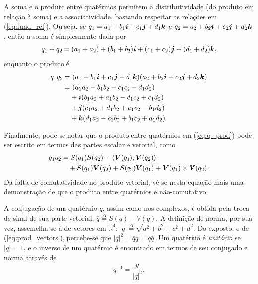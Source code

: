 A soma e o produto entre quat\'ernios permitem a distributividade (do produto em rela\c c\~ao \`a soma) e a associatividade, bastando respeitar as rela\c c\~oes em (\ref{eq:fund_rel}). Ou seja, se $q_1 = a_1 + b_1\boldsymbol{i} + c_1\boldsymbol{j} + d_1\boldsymbol{k}$ e $q_2 = a_2 +  b_2\boldsymbol{i} + c_2\boldsymbol{j} + d_2\boldsymbol{k}$, ent\~ao a soma \'e simplesmente dada por
\begin{equation}
q_1 + q_2 = (a_1 + a_2) + (b_1 + b_2)\boldsymbol{i} + (c_1 + c_2)\boldsymbol{j} + (d_1 + d_2)\boldsymbol{k},
\end{equation}
enquanto o produto \'e
\begin{equation}
\label{eq:q_prod}
\begin{aligned}
q_1 q_2 = &  \ (a_1 + b_1\boldsymbol{i} + c_1\boldsymbol{j} + d_1\boldsymbol{k}) (a_2 +  b_2\boldsymbol{i} + c_2\boldsymbol{j} + d_2\boldsymbol{k})  \\ 
= & \ (a_1 a_2 - b_1 b_2 - c_1 c_2 - d_1 d_2)  \\
& + \boldsymbol{i} (b_1 a_2 + a_1 b_2 - d_1 c_2 + c_1 d_2)  \\
& + \boldsymbol{j} (c_1 a_2 + d_1 b_2 + a_1 c_2 - b_1 d_2)  \\
& + \boldsymbol{k} (d_1 a_2 - c_1 b_2 + b_1 c_2 + a_1 d_2).
\end{aligned}
\end{equation}

Finalmente, pode-se notar que o produto entre quat\'ernios em  (\ref{eq:q_prod}) pode ser escrito em termos das partes escalar e vetorial, como
\begin{equation}
\label{eq:prod_vectors}
\begin{aligned}
q_1 q_2 = & \ S(q_1)S(q_2) - \langle\boldsymbol{V}(q_1), \boldsymbol{V}(q_2)\rangle \\
& + S(q_1) \boldsymbol{V}(q_2) + S(q_2)\boldsymbol{V}(q_1) + \boldsymbol{V}(q_1) \times \boldsymbol{V}(q_2).
\end{aligned}
\end{equation}
Da falta de comutatividade no produto vetorial, v\^e-se nesta equa\c c\~ao mais uma demonstra\c c\~ao de que o produto entre quat\'ernios \'e n\~ao-comutativo.

A conjuga\c c\~ao de um quat\'ernio $ q $, assim como nos complexos, \'e obtida pela troca de sinal de sua parte vetorial, $ \bar{q} \overset{\Delta}{=} S(q) - V(q) $. A defini\c c\~ao de norma, por sua vez, assemelha-se \`a de vetores em $ \mathbb{R}^4 $: $ |q| \overset{\Delta}{=} \sqrt{a^2 + b^2 + c^2 + d^2} $. Do exposto, e de (\ref{eq:prod_vectors}), percebe-se que $ |q|^2 = \bar{q} q = q \bar{q} $. Um quat\'ernio \'e \emph{unit\'ario} se $ |q| = 1 $, e o inverso de um quat\'ernio \'e encontrado em termos de seu conjugado e norma atrav\'es de
\begin{equation}
q^{-1} = \frac{\bar{q}}{|q|^2}.
\end{equation}

